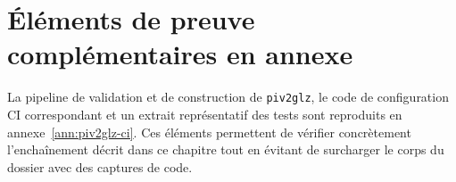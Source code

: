 
\section{Éléments de preuve complémentaires en annexe}

La pipeline de validation et de construction de \texttt{piv2glz}, le code de configuration CI correspondant et un extrait représentatif des tests sont reproduits en annexe~\ref{ann:piv2glz-ci}. Ces éléments permettent de vérifier concrètement l'enchaînement décrit dans ce chapitre tout en évitant de surcharger le corps du dossier avec des captures de code.
